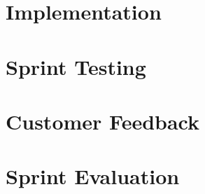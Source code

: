 \section{Implementation}


\section{Sprint Testing}


\section{Customer Feedback}


\section{Sprint Evaluation}


